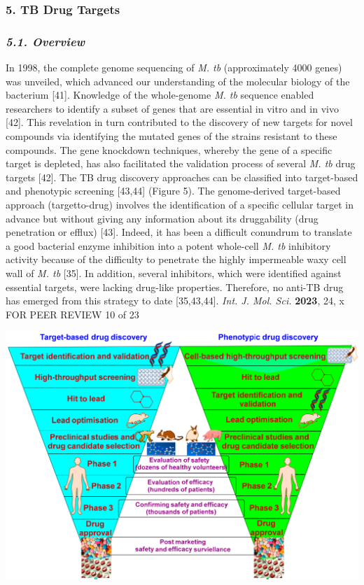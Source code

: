\documentclass{article}
\begin{document}
\subsubsection{\textbf{5. TB Drug Targets}}

\subsubsection{\textit{5.1. Overview}}

In 1998, the complete genome sequencing of \textit{M. tb} (approximately 4000 genes) was unveiled, which advanced our understanding of the molecular biology of the bacterium [41]. Knowledge of the whole-genome \textit{M. tb} sequence enabled researchers to identify a subset of genes that are essential in vitro and in vivo [42]. This revelation in turn contributed to the discovery of new targets for novel compounds via identifying the mutated genes of the strains resistant to these compounds. The gene knockdown techniques, whereby the gene of a specific target is depleted, has also facilitated the validation process of several \textit{M. tb} drug targets [42]. The TB drug discovery approaches can be classified into target-based and phenotypic screening [43,44] (Figure 5). The genome-derived target-based approach (targetto-drug) involves the identification of a specific cellular target in advance but without giving any information about its druggability (drug penetration or efflux) [43]. Indeed, it has been a difficult conundrum to translate a good bacterial enzyme inhibition into a potent whole-cell \textit{M. tb} inhibitory activity because of the difficulty to penetrate the highly impermeable waxy cell wall of \textit{M. tb} [35]. In addition, several inhibitors, which were identified against essential targets, were lacking drug-like properties. Therefore, no anti-TB drug has emerged from this strategy to date [35,43,44]. \textit{Int. J. Mol. Sci.} \textbf{2023}, 24, x FOR PEER REVIEW 10 of 23


\includegraphics{_page_8_Figure_5.png}
\end{document}
